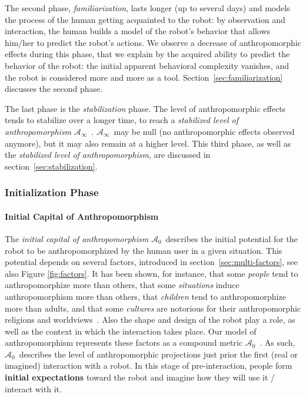 \documentclass{frontiersSCNS} %
\newcommand{\ICA}{{$\mathcal{A}_0$~}}
\newcommand{\SLA}{{$\mathcal{A}_\infty$~}}
\begin{document}
The second phase, \emph{familiarization}, lasts longer (up to several days) and
models the process of the human getting acquainted to the robot: by observation
and interaction, the human builds a model of the robot's behavior that allows
him/her to predict the robot's actions. We observe a decrease of
anthropomorphic effects during this phase, that we explain by the acquired
ability to predict the behavior of the robot: the initial apparent behavioral
complexity vanishes, and the robot is considered more and more as a tool.
Section~\ref{sec:familiarization} discusses the second phase.

The last phase is the \emph{stabilization} phase. The level of anthropomorphic
effects tends to stabilize over a longer time, to reach a \emph{stabilized
level of anthropomorphism} \SLA. \SLA may be null (no anthropomorphic
effects observed anymore), but it may also remain at a higher level.  This
third phase, as well as the \emph{stabilized level of anthropomorphism}, are
discussed in section~\ref{sec:stabilization}.


\subsubsection{Initialization Phase}
\label{sec:initialization}

\paragraph{Initial Capital of Anthropomorphism}
\label{sec:ica}

The \emph{initial capital of anthropomorphism} \ICA describes the initial potential
for the robot to be anthropomorphized by the human user in a given situation.
This potential depends on several factors, introduced in
section~\ref{sec:multi-factors}, see also Figure \ref{fig:factors}. It has been shown, for instance, that
some \textit{people} tend to anthropomorphize more than others, that some
\textit{situations} induce anthropomorphism more than others, that
\textit{children} tend to anthropomorphize more than adults, and that some
\textit{cultures} are notorious for their anthropomorphic religions and
worldviews~\citep{epley_when_2008}. Also the shape and design of the robot play a
role, as well as the context in which the interaction takes place. Our model of
anthropomorphism represents these factors as a compound metric \ICA. As such,
\ICA describes the level of anthropomorphic projections just prior the first
(real or imagined) interaction with a robot. In this stage of pre-interaction, people
form \textbf{initial expectations} toward the robot and imagine how they will use it /
interact with it.
\end{document}
